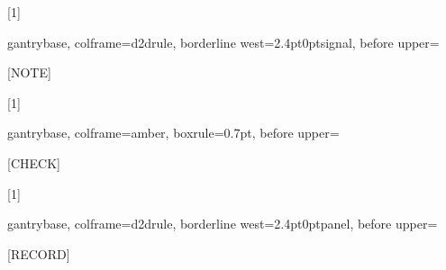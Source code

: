 \usepackage{tikz}
\usetikzlibrary{positioning,arrows.meta,calc}
\usepackage[most]{tcolorbox}
\usepackage{caption}
\usepackage{needspace}
\usepackage{enumitem}
\usepackage{colortbl}
\usepackage{titlesec}
\usepackage{fancyhdr}
\usepackage{fvextra}

\newfontfamily{}
\newfontfamily{}
\newfontfamily{}

\setlength{\parskip}{0.38em plus 0.06em minus 0.05em}
\setlength{\parindent}{0pt}
\setlength{\emergencystretch}{2.5em}
\color{d2dink}
\AtBeginDocument{\hypersetup{hidelinks}\color{d2dink}\plexsans}

\newcommand{\chnum}{\ifnum\value{chapter}<10 0\fi\thechapter}
\newcommand{\gantryfoot}{%
  \begin{tikzpicture}
    \fill[panel] (0,0) rectangle (\textwidth,0.30in);
    \node[anchor=west, inner sep=0, font=\plexmono\fontsize{7.5}{9}\selectfont, text=amberon]
      at (0.1in,0.15in) {D2D\quad PART I\quad MODERN C++};
    \node[inner sep=0, font=\plexmono\fontsize{7.5}{9}\selectfont, text=white]
      at (0.5\textwidth,0.15in) {CH \chnum};
    \node[anchor=east, inner sep=0, font=\plexmono\fontsize{7.5}{9}\selectfont, text=white]
      at (\textwidth-0.1in,0.15in) {\thepage};
  \end{tikzpicture}}

\newcommand{\gantrylabel}[3]{{\plexmono\scriptsize\textcolor{#1}{[#2]}}%
  \hspace{0.45em}{\plexsans\footnotesize\bfseries #3}\par\vspace{1pt}}
[1]{gantrybase, colframe=d2drule, borderline west={2.4pt}{0pt}{signal},
  before upper={\gantrylabel{signal}{NOTE}{#1}}}
[1]{gantrybase, colframe=amber, boxrule=0.7pt,
  before upper={\gantrylabel{amber}{CHECK}{#1}}}
[1]{gantrybase, colframe=d2drule, borderline west={2.4pt}{0pt}{panel},
  before upper={\gantrylabel{panel}{RECORD}{#1}}}

